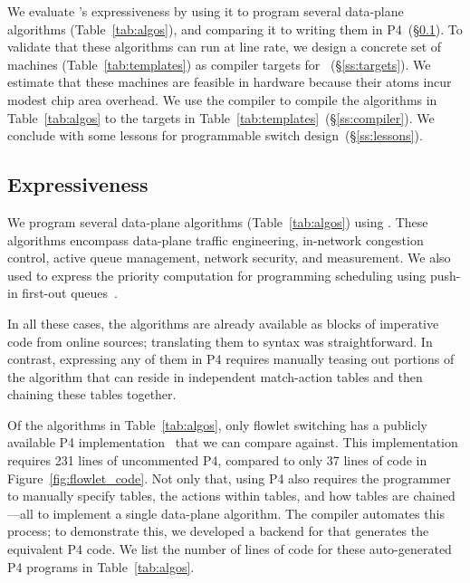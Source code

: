 We evaluate \pktlanguage's expressiveness by using it to program several
data-plane algorithms (Table~\ref{tab:algos}), and comparing it to writing them
in P4~(\S\ref{ss:expressiveness}).  To validate that these algorithms can
run at line rate, we design a concrete set of \absmachine machines
(Table~\ref{tab:templates}) as compiler targets for
\pktlanguage~(\S\ref{ss:targets}).  We estimate that these machines are
feasible in hardware because their atoms incur modest chip area overhead.
We use the \pktlanguage compiler to compile the algorithms in
Table~\ref{tab:algos} to the targets in
Table~\ref{tab:templates}~(\S\ref{ss:compiler}).  We conclude with some lessons
for programmable switch design~(\S\ref{ss:lessons}).

\subsection{Expressiveness}
\label{ss:expressiveness}

We program several data-plane
algorithms (Table~\ref{tab:algos}) using \pktlanguage. These algorithms
encompass data-plane traffic engineering, in-network congestion control, active
queue management, network security, and measurement. We also used \pktlanguage
to express the priority computation for programming scheduling using
push-in first-out queues~\cite{pifo_sigcomm}.

In all these cases, the algorithms are already available as blocks of
imperative code from online sources; translating them to \pktlanguage syntax
was straightforward. In contrast, expressing any of them in P4 requires
manually teasing out portions of the algorithm that can reside in independent
match-action tables and then chaining these tables together.

Of the algorithms in Table~\ref{tab:algos}, only flowlet switching has a
publicly available P4 implementation~\cite{p4_flowlet} that we can compare
against. This implementation requires 231 lines of uncommented P4, compared to
only 37 lines of \pktlanguage code in Figure~\ref{fig:flowlet_code}. Not only
that, using P4 also requires the programmer to manually specify tables, the
actions within tables, and how tables are chained---all to implement a single
data-plane algorithm. The \pktlanguage compiler automates this process; to
demonstrate this, we developed a backend for \pktlanguage that generates the
equivalent P4 code. We list the number of lines of code for these
auto-generated P4 programs in Table~\ref{tab:algos}.
